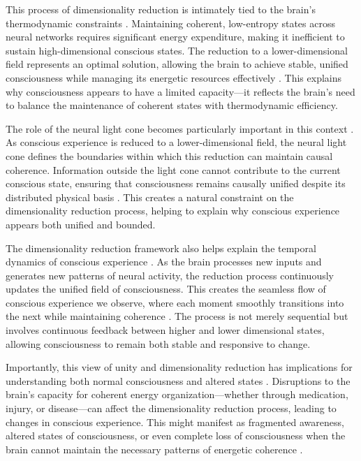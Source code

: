 This process of dimensionality reduction is intimately tied to the brain's thermodynamic constraints \cite{hameroff2014consciousness}. Maintaining coherent, low-entropy states across neural networks requires significant energy expenditure, making it inefficient to sustain high-dimensional conscious states. The reduction to a lower-dimensional field represents an optimal solution, allowing the brain to achieve stable, unified consciousness while managing its energetic resources effectively \cite{koch2017can}. This explains why consciousness appears to have a limited capacity—it reflects the brain's need to balance the maintenance of coherent states with thermodynamic efficiency.

The role of the neural light cone becomes particularly important in this context \cite{james1890principles}. As conscious experience is reduced to a lower-dimensional field, the neural light cone defines the boundaries within which this reduction can maintain causal coherence. Information outside the light cone cannot contribute to the current conscious state, ensuring that consciousness remains causally unified despite its distributed physical basis \cite{revonsuo2006inner}. This creates a natural constraint on the dimensionality reduction process, helping to explain why conscious experience appears both unified and bounded.

The dimensionality reduction framework also helps explain the temporal dynamics of conscious experience \cite{varela1999present}. As the brain processes new inputs and generates new patterns of neural activity, the reduction process continuously updates the unified field of consciousness. This creates the seamless flow of conscious experience we observe, where each moment smoothly transitions into the next while maintaining coherence \cite{dainton2006stream}. The process is not merely sequential but involves continuous feedback between higher and lower dimensional states, allowing consciousness to remain both stable and responsive to change.

Importantly, this view of unity and dimensionality reduction has implications for understanding both normal consciousness and altered states \cite{carhart2014entropic}. Disruptions to the brain's capacity for coherent energy organization—whether through medication, injury, or disease—can affect the dimensionality reduction process, leading to changes in conscious experience. This might manifest as fragmented awareness, altered states of consciousness, or even complete loss of consciousness when the brain cannot maintain the necessary patterns of energetic coherence \cite{baars2002conscious}.

